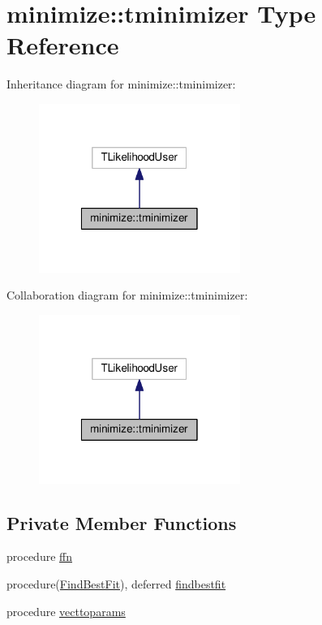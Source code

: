 \hypertarget{structminimize_1_1tminimizer}{}\section{minimize\+:\+:tminimizer Type Reference}
\label{structminimize_1_1tminimizer}


Inheritance diagram for minimize\+:\+:tminimizer\+:
\nopagebreak
\begin{figure}[H]
\begin{center}
\leavevmode
\includegraphics[width=186pt]{structminimize_1_1tminimizer__inherit__graph}
\end{center}
\end{figure}


Collaboration diagram for minimize\+:\+:tminimizer\+:
\nopagebreak
\begin{figure}[H]
\begin{center}
\leavevmode
\includegraphics[width=186pt]{structminimize_1_1tminimizer__coll__graph}
\end{center}
\end{figure}
\subsection*{Private Member Functions}
\begin{DoxyCompactItemize}
\item 
procedure \mbox{\hyperlink{structminimize_1_1tminimizer_a27d3785b4fccc31f0b16f388479e4c42}{ffn}}
\item 
procedure(\mbox{\hyperlink{interfaceminimize_1_1FindBestFit}{Find\+Best\+Fit}}), deferred \mbox{\hyperlink{structminimize_1_1tminimizer_a1b2dbcd57ca1341162d79727a8cba2a8}{findbestfit}}
\item 
procedure \mbox{\hyperlink{structminimize_1_1tminimizer_a2e7f83b0f42230f4b4628d86e2260d46}{vecttoparams}}
\end{DoxyCompactItemize}
